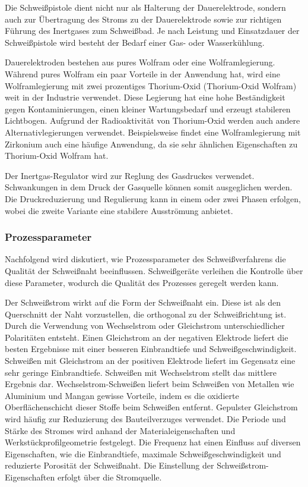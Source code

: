 Die Schweißpistole dient nicht nur als Halterung der Dauerelektrode, sondern auch zur Übertragung des Stroms zu der Dauerelektrode sowie zur richtigen Führung des Inertgases zum Schweißbad. Je nach Leistung und Einsatzdauer der Schweißpistole wird besteht der Bedarf einer Gas- oder Wasserkühlung. \autocite[29]{Pires_WeldingRobots_2006}

Dauerelektroden bestehen aus pures Wolfram oder eine Wolframlegierung. Während pures Wolfram ein paar Vorteile in der Anwendung hat, wird eine Wolframlegierung mit zwei prozentiges Thorium-Oxid (Thorium-Oxid Wolfram) weit in der Industrie verwendet. Diese Legierung hat eine hohe Beständigkeit gegen Kontaminierungen, einen kleiner Wartungsbedarf und erzeugt stabileren Lichtbogen. Aufgrund der Radioaktivität von Thorium-Oxid werden auch andere Alternativlegierungen verwendet. Beispielsweise findet eine Wolframlegierung mit Zirkonium auch eine häufige Anwendung, da sie sehr ähnlichen Eigenschaften zu Thorium-Oxid Wolfram hat. \autocite[29-30]{Pires_WeldingRobots_2006}

Der Inertgas-Regulator wird zur Reglung des Gasdruckes verwendet. Schwankungen in dem Druck der Gasquelle können somit ausgeglichen werden. Die Druckreduzierung und Regulierung kann in einem oder zwei Phasen erfolgen, wobei die zweite Variante eine stabilere Ausströmung anbietet. \autocite[31]{Pires_WeldingRobots_2006}

\subsubsection{Prozessparameter}
Nachfolgend wird diskutiert, wie Prozessparameter des Schweißverfahrens die Qualität der Schweißnaht beeinflussen. Schweißgeräte verleihen die Kontrolle über diese Parameter, wodurch die Qualität des Prozesses geregelt werden kann. 

Der Schweißstrom wirkt auf die Form der Schweißnaht ein. Diese ist als den Querschnitt der Naht vorzustellen, die orthogonal zu der Schweißrichtung ist. Durch die Verwendung von Wechselstrom oder Gleichstrom unterschiedlicher Polaritäten entsteht. Einen Gleichstrom an der negativen Elektrode liefert die besten Ergebnisse mit einer besseren Einbrandtiefe und Schweißgeschwindigkeit. Schweißen mit Gleichstrom an der positiven Elektrode liefert im Gegensatz eine sehr geringe Einbrandtiefe. Schweißen mit Wechselstrom stellt das mittlere Ergebnis dar. Wechselstrom-Schweißen liefert beim Schweißen von Metallen wie Aluminium und Mangan gewisse Vorteile, indem es die oxidierte Oberflächenschicht dieser Stoffe beim Schweißen entfernt. Gepulster Gleichstrom wird häufig zur Reduzierung des Bauteilverzuges verwendet. Die Periode und Stärke des Stromes wird anhand der Materialeigenschaften und Werkstückprofilgeometrie festgelegt. Die Frequenz hat einen Einfluss auf diversen Eigenschaften, wie die Einbrandtiefe, maximale Schweißgeschwindigkeit und reduzierte Porosität der Schweißnaht. Die Einstellung der Schweißstrom-Eigenschaften erfolgt über die Stromquelle. \autocite[31-32]{Pires_WeldingRobots_2006}

